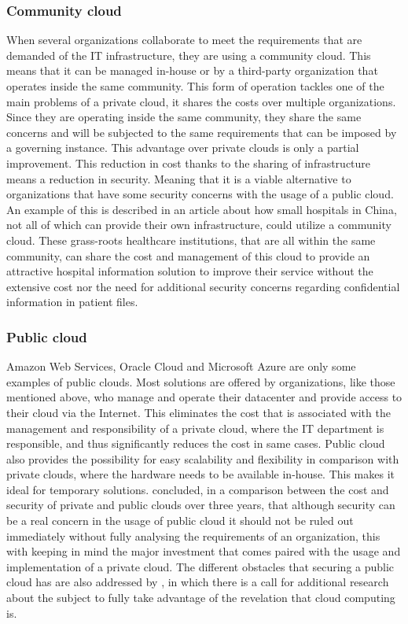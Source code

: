 \subsubsection{Community cloud}
When several organizations collaborate to meet the requirements that are demanded of the IT infrastructure, they are using a community cloud. This means that it can be managed in-house or by a third-party organization that operates inside the same community. This form of operation tackles one of the main problems of a private cloud, it shares the costs over multiple organizations. Since they are operating inside the same community, they share the same concerns and will be subjected to the same requirements that can be imposed by a governing instance. 
This advantage over private clouds is only a partial improvement. This reduction in cost thanks to the sharing of infrastructure means a reduction in security. Meaning that it is a viable alternative to  organizations that have some security concerns with the usage of a public cloud. 
\newline
An example of this is described in an article \autocite{Yao2014} about how small hospitals in China, not all of which can provide their own infrastructure, could utilize a community cloud. These grass-roots healthcare institutions, that are all within the same community, can share the cost and management of this cloud to provide an attractive hospital information solution to improve their service without the extensive cost nor the need for additional security concerns regarding confidential information in patient files.

\subsubsection{Public cloud}
Amazon Web Services, Oracle Cloud and Microsoft Azure are only some examples of public clouds. Most solutions are offered by organizations, like those mentioned above, who manage and operate their datacenter and provide access to their cloud via the Internet. This eliminates the cost that is associated with the management and responsibility of a private cloud, where the IT department is responsible, and thus significantly reduces the cost in same cases. Public cloud also provides the possibility for easy scalability and flexibility in comparison with private clouds, where the hardware needs to be available in-house. This makes it ideal for temporary solutions.
\newline
\textcite{Singh2012} concluded, in a comparison between the cost and security of private and public clouds over three years, that although security can be a real concern in the usage of public cloud it should not be ruled out immediately without fully analysing the requirements of an organization, this with keeping in mind the major investment that comes paired with the usage and implementation of a private cloud.  
The different obstacles that securing a public cloud has are also addressed by \textcite{Ren2012}, in which there is a call for additional research about the subject to fully take advantage of the revelation that cloud computing is. 

